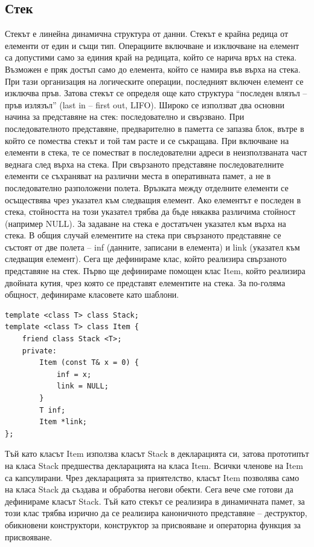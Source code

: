 \documentclass[11pt]{article} %
\begin{document}
\subsection{Стек}
Стекът е линейна динамична структура от данни. Стекът е крайна редица от елементи от един и същи тип. Операциите включване и изключване на елемент са допустими само за единия край на редицата, който се нарича връх на стека. Възможен е пряк достъп само до елемента, който се намира във върха на стека. При тази организация на логическите операции, последният включен елемент се изключва пръв. Затова стекът се определя още като структура “последен влязъл – пръв излязъл” (last in – first out, LIFO).
Широко се използват два основни начина за представяне на стек: последователно и свързвано. При последователното представяне, предварително в паметта се запазва блок, вътре в който се помества стекът и той там расте и се съкращава. При включване на елементи в стека, те се поместват в последователни адреси в неизползваната част веднага след върха на стека.
При свързаното представяне последователните елементи се съхраняват на различни места в оперативната памет, а не в последователно разположени полета. Връзката между отделните елементи се осъществява чрез указател към следващия елемент. Ако елементът е последен в стека, стойността на този указател трябва да бъде някаква различима стойност (например NULL). За задаване на стека е достатъчен указател към върха на стека. В общия случай елементите на стека при свързаното представяне се състоят от две полета – inf (данните, записани в елемента) и link (указател към следващия елемент). Сега ще дефинираме клас, който реализира свързаното представяне на стек.
Първо ще дефинираме помощен клас Item, който реализира двойната кутия, чрез която се представят елементите на стека.
За по-голяма общност, дефинираме класовете като шаблони.

\begin{verbatim}
template <class T> class Stack;
template <class T> class Item {
	friend class Stack <T>;
	private:
		Item (const T& x = 0) { 
			inf = x;
			link = NULL;
		}
		T inf;
		Item *link;
};
\end{verbatim}

Тъй като класът Item използва класът Stack в декларацията си, затова прототипът на класа Stack предшества декларацията на класа Item. Всички членове на Item са капсулирани. Чрез декларацията за приятелство, класът Item позволява само на класа Stack да създава и обработва негови обекти. Сега вече сме готови да дефинираме класът Stack. Тъй като стекът се реализира в динамичната памет, за този клас трябва изрично да се реализира каноничното представяне – деструктор, обикновени конструктори, конструктор за присвояване и операторна функция за присвояване.
\end{document}
